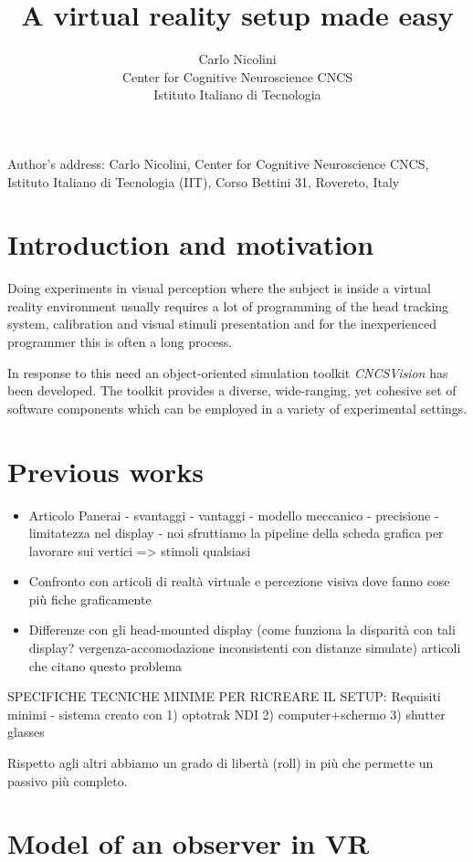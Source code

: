 \documentclass[acmtocl,acmnow]{acmtrans2m}
\title{\textbf{A virtual reality setup made easy}}
\author{Carlo Nicolini\\Center for Cognitive Neuroscience CNCS\\Istituto
Italiano di Tecnologia}
\begin{document}
\begin{bottomstuff}
Author's address: Carlo Nicolini, Center for Cognitive Neuroscience CNCS,
Istituto Italiano di Tecnologia (IIT),
Corso Bettini 31, Rovereto, Italy
\end{bottomstuff}

\maketitle

\section{Introduction and motivation}
Doing experiments in visual perception where the subject is inside a virtual reality environment usually requires a lot
of programming of the head tracking system, calibration and visual stimuli presentation and for the inexperienced programmer this is often a long process.

In response to this need an object-oriented simulation toolkit \textit{CNCSVision} has been developed. The toolkit provides a diverse, wide-ranging, yet cohesive set of software components which can be employed in a variety of experimental settings.
\section{Previous works}
\begin{itemize}
 \item Articolo Panerai - svantaggi - vantaggi - modello meccanico - precisione - limitatezza nel display - noi sfruttiamo la pipeline della scheda grafica per lavorare sui vertici => stimoli qualsiasi
 \item Confronto con articoli di realtà virtuale e percezione visiva dove fanno cose più fiche graficamente
 \item Differenze con gli head-mounted display (come funziona la disparità con tali display? vergenza-accomodazione inconsistenti con distanze simulate) articoli che citano questo problema
\end{itemize}
SPECIFICHE TECNICHE MINIME PER RICREARE IL SETUP:
Requisiti minimi - 
sistema creato con 1) optotrak NDI 2) computer+schermo 3) shutter glasses

Rispetto agli altri abbiamo un grado di libertà (roll) in più che permette un passivo più completo.

\section{Model of an observer in VR}
\end{document}
